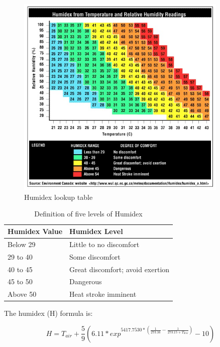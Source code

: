 \begin{figure}[hbtp] 
\centering
\includegraphics[width=0.9\textwidth, height=0.9\textheight, keepaspectratio=true]{media/humidex_chart.jpg}
\caption{Humidex lookup table \protect \label{fig:humidex-lookup-table}}
\end{figure}

\begin{table}
\centering
\caption{Definition of five levels of Humidex \protect \label{table:humidex-chart}} \tabularnewline
\begin{tabular}{ |p{1in}|p{3in}|  }
\hline
      \textbf{Humidex Value} & \textbf{Humidex Level} \\ \hline
      Below 29 & Little to no discomfort \\ \hline
      29 to 40 & Some discomfort \\ \hline
      40 to 45 & Great discomfort; avoid exertion \\ \hline
      45 to 50 & Dangerous \\ \hline
      Above 50 & Heat stroke imminent \\ \hline
\end{tabular}
\end{table}

The humidex (H) formula is:

\begin{equation}  \label{eq:rm-5}
H = T_{air} + \frac{5}{9}(6.11 * exp^{5417.7530 * (\frac{1}{273.16} - \frac{1}{273.15 + T_{dew}})} - 10)
\end{equation}

